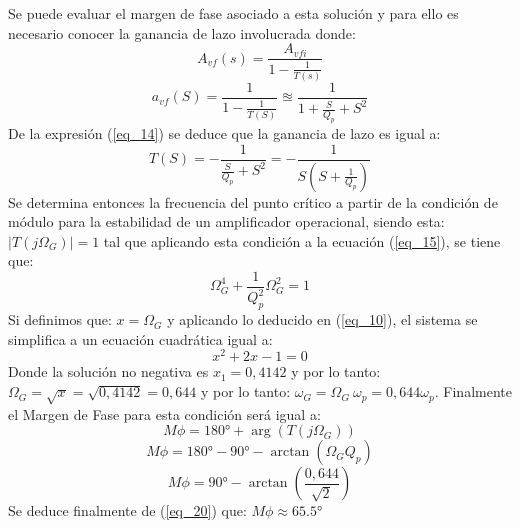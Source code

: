 \documentclass[12pt,a4paper]{article}
\begin{document}
\begin{itemize}
    Se puede evaluar el margen de fase asociado a esta solución y para ello es necesario conocer la ganancia de lazo involucrada donde:
    \begin{equation}
        \label{eq_13}
        A_{vf}(s) = \frac{A_{vfi}}{1 - \frac{1}{T(s)}}
    \end{equation}
    \begin{equation}
        \label{eq_14}
        a_{vf}(S) = \frac{1}{1 - \frac{1}{T(S)}} \approxeq \frac{1}{1 + \frac{S}{Q_p} + S^2}
    \end{equation}
    De la expresión (\ref{eq_14}) se deduce que la ganancia de lazo es igual a:
    \begin{equation}
        \label{eq_15}
        T(S) = -\frac{1}{\frac{S}{Q_p} + S^2} = -\frac{1}{S(S + \frac{1}{Q_p})}
    \end{equation}
    Se determina entonces la frecuencia del punto crítico a partir de la condición de módulo para la estabilidad de un amplificador operacional, siendo esta: $|T(j\Omega_G)|=1$ tal que aplicando esta condición  a la ecuación (\ref{eq_15}), se tiene que:
    \begin{equation}
        \label{eq_16}
        \Omega_G^4 + \frac{1}{Q_p^2} \Omega_G^2 = 1
    \end{equation}
    Si definimos que: $x=\Omega_G$ y aplicando lo deducido en (\ref{eq_10}), el sistema se simplifica a un ecuación cuadrática igual a:
    \begin{equation}
        \label{eq_17}
        x^2 + 2x - 1 = 0
    \end{equation}
    Donde la solución no negativa es $x_1=0,4142$ y por lo tanto: $\Omega_G=\sqrt{x}=\sqrt{0,4142}=0,644$ y por lo tanto: $\omega_G = \Omega_G \ \omega_p = 0,644\omega_p$. Finalmente el Margen de Fase para esta condición será igual a:
    \begin{equation}
        \label{eq_18}
        M\phi = \ang{180} + \arg(T(j\Omega_G))
    \end{equation}
    \begin{equation}
        \label{eq_19}
        M\phi = \ang{180} - \ang{90} - \arctan(\Omega_G Q_p)  
    \end{equation}
    \begin{equation}
        \label{eq_20}
        M\phi = \ang{90} - \arctan\left(\frac{0,644}{\sqrt{2}}\right) 
    \end{equation}
    Se deduce finalmente de (\ref{eq_20}) que: $M\phi \approx \ang{65,5}$


\end{itemize}
\end{document}
